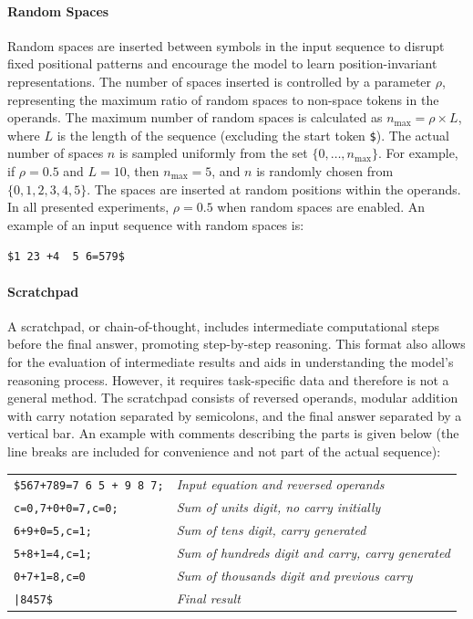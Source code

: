 \paragraph{Random Spaces}
Random spaces are inserted between symbols in the input sequence to disrupt fixed positional patterns and encourage the model to learn position-invariant representations. The number of spaces inserted is controlled by a parameter $\rho$, representing the maximum ratio of random spaces to non-space tokens in the operands. The maximum number of random spaces is calculated as $n_{\text{max}} = \rho \times L$, where $L$ is the length of the sequence (excluding the start token \texttt{\$}). The actual number of spaces $n$ is sampled uniformly from the set $\{0, \dots, n_{\text{max}}\}$. For example, if $\rho = 0.5$ and $L = 10$, then $n_{\text{max}} = 5$, and $n$ is randomly chosen from $\{0, 1, 2, 3, 4, 5\}$. The spaces are inserted at random positions within the operands. In all presented experiments, $\rho = 0.5$ when random spaces are enabled. An example of an input sequence with random spaces is:
\begin{center}
    \verb|$1 23 +4  5 6=579$|
\end{center}

\paragraph{Scratchpad}
A scratchpad, or chain-of-thought, includes intermediate computational steps before the final answer, promoting step-by-step reasoning. This format also allows for the evaluation of intermediate results and aids in understanding the model's reasoning process. However, it requires task-specific data and therefore is not a general method. The scratchpad consists of reversed operands, modular addition with carry notation separated by semicolons, and the final answer separated by a vertical bar. An example with comments describing the parts is given below (the line breaks are included for convenience and not part of the actual sequence):
\begin{center}
    \begin{tabular}{l l}
        \verb|$567+789=7 6 5 + 9 8 7;| & \textit{Input equation and reversed operands}             \\
        \verb|c=0,7+0+0=7,c=0;|        & \textit{Sum of units digit, no carry initially}           \\
        \verb|6+9+0=5,c=1;|            & \textit{Sum of tens digit, carry generated}               \\
        \verb|5+8+1=4,c=1;|            & \textit{Sum of hundreds digit and carry, carry generated} \\
        \verb|0+7+1=8,c=0|             & \textit{Sum of thousands digit and previous carry}        \\
        \texttt{|8457\$}               & \textit{Final result}
    \end{tabular}
\end{center}

